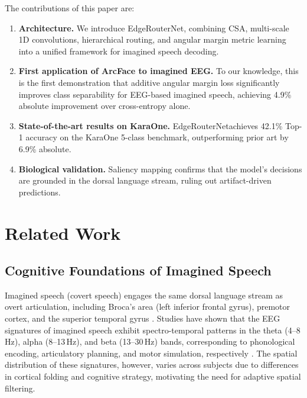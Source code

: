 \documentclass[conference]{IEEEtran}
\newcommand{\method}{EdgeRouterNet}
\begin{document}
The contributions of this paper are:
\begin{enumerate}
	\item \textbf{Architecture.} We introduce \method, combining CSA, multi-scale 1D convolutions, hierarchical routing, and angular margin metric learning into a unified framework for imagined speech decoding.
	\item \textbf{First application of ArcFace to imagined EEG.} To our knowledge, this is the first demonstration that additive angular margin loss significantly improves class separability for EEG-based imagined speech, achieving 4.9\% absolute improvement over cross-entropy alone.
	\item \textbf{State-of-the-art results on KaraOne.} \method achieves 42.1\% Top-1 accuracy on the KaraOne 5-class benchmark, outperforming prior art by 6.9\% absolute.
	\item \textbf{Biological validation.} Saliency mapping confirms that the model's decisions are grounded in the dorsal language stream, ruling out artifact-driven predictions.
\end{enumerate}

\section{Related Work}

\subsection{Cognitive Foundations of Imagined Speech}
Imagined speech (covert speech) engages the same dorsal language stream as overt articulation, including Broca's area (left inferior frontal gyrus), premotor cortex, and the superior temporal gyrus \cite{hickok2007cortical}. Studies have shown that the EEG signatures of imagined speech exhibit spectro-temporal patterns in the theta (4--8\,Hz), alpha (8--13\,Hz), and beta (13--30\,Hz) bands, corresponding to phonological encoding, articulatory planning, and motor simulation, respectively \cite{panachakel2021deep}. The spatial distribution of these signatures, however, varies across subjects due to differences in cortical folding and cognitive strategy, motivating the need for adaptive spatial filtering.
\end{document}
